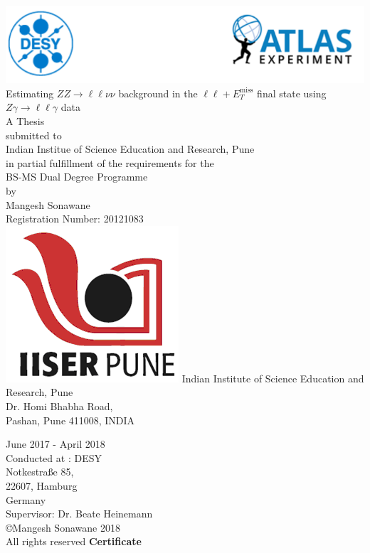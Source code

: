\documentclass[11pt,a4paper,openright,twoside]{report}
\newcommand{\ZZ}{$ZZ\to \ell\ell\nu\nu$ }
\newcommand{\Zg}{$Z\gamma\to \ell\ell\gamma$ }
\newcommand{\llM}{$\ell\ell+E_T^{\mathrm{miss}}$ }
\begin{document}
\begin{titlepage}
\pagestyle{plain}
\centering
\includegraphics[width=0.9\linewidth]{Title_Head.png}
\vfill
{\Huge Estimating \ZZ background in the \llM final state using \Zg data\\\vspace{1cm}\Large A Thesis \\}
\vspace{1cm}
{\Large submitted to\\Indian Institue of Science Education and Research, Pune\\ in partial fulfillment of the requirements for the \\BS-MS Dual Degree Programme\vspace{1cm}\\by\vspace{1cm}\\Mangesh Sonawane\vspace{0.2cm}\\Registration Number: 20121083\\}
\vspace{1cm}
\includegraphics[scale=0.8]{iiser_logo.png}
\vfill
{\Large Indian Institute of Science Education and Research, Pune\vspace{0.1cm}\\Dr. Homi Bhabha Road,\vspace{0.3cm}\\ Pashan, Pune 411008, INDIA}
\vfill
\vfill
\end{titlepage}
\pagestyle{empty}
\begin{center}
{\large June 2017 - April 2018\\}
\vspace{10cm}
\large 
Conducted at : DESY\\
Notkestra\ss e 85,\\
22607, Hamburg\\
Germany\\
\vspace{10cm}
Supervisor: Dr. Beate Heinemann\\
\copyright Mangesh Sonawane 2018\\
All rights reserved
\vfill
\newpage
\Huge \textbf{Certificate\\}
\end{center}
\end{document}
